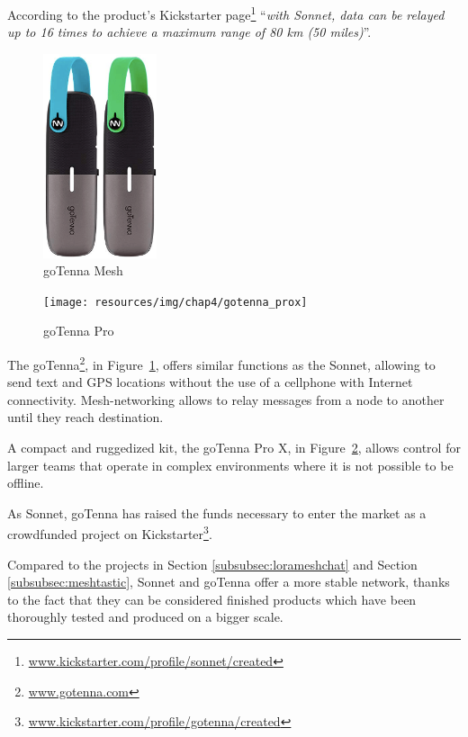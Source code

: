 				According to the product's Kickstarter page\footnote{ \url{www.kickstarter.com/profile/sonnet/created}} ``\textit{with Sonnet, data can be relayed up to 16 times to achieve a maximum range of 80 km (50 miles)}''.

				\begin{minipage}{0.5\textwidth}%
					\begin{figure}[H]
						\centering
						\includegraphics[height=6cm]{resources/img/chap4/gotenna}
						\caption{goTenna Mesh}
						\label{img:gotenna}
					\end{figure}
				\end{minipage}%
				\hfill%
				\begin{minipage}{0.5\textwidth}\raggedright
					\begin{figure}[H]
						\centering
						\texttt{[image: resources/img/chap4/gotenna\_prox]}
						\caption{goTenna Pro}
						\label{img:gotenna_pro}
					\end{figure}
				\end{minipage}%
				\newpage
				
				The goTenna\footnote{ \url{www.gotenna.com}}, in Figure~\ref{img:gotenna}, offers similar functions as the Sonnet, allowing to send text and GPS locations without the use of a cellphone with Internet connectivity.
				Mesh-networking allows to relay messages from a node to another until they reach destination.
				
				A compact and ruggedized kit, the goTenna Pro X, in Figure~\ref{img:gotenna_pro}, allows control for larger teams that operate in complex environments where it is not possible to be offline.
						
				As Sonnet, goTenna has raised the funds necessary to enter the market as a crowdfunded project on Kickstarter\footnote{ \url{www.kickstarter.com/profile/gotenna/created}}.
				
				Compared to the projects in Section \ref{subsubsec:lorameshchat} and Section \ref{subsubsec:meshtastic}, Sonnet and goTenna offer a more stable network, thanks to the fact that they can be considered finished products which have been thoroughly tested and produced on a bigger scale.
						
